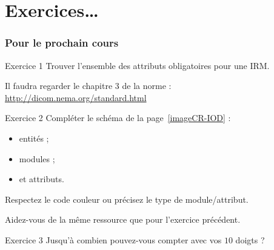 \section{Exercices\ldots}

	\frame
	{
		\frametitle{Pour le prochain cours}
		
		{
			\begin{block}{Exercice 1}
				Trouver l'ensemble des attributs obligatoires pour une IRM.

				Il faudra regarder le chapitre 3 de la norme : \url{http://dicom.nema.org/standard.html}
			\end{block}
		}

		{
			\begin{block}{Exercice 2}
				Compl\'eter le sch\'ema de la page~\ref{imageCR-IOD} :
				\begin{itemize}
					\item entit\'es ;
					\item modules ;
					\item et attributs.
				\end{itemize}
				Respectez le code couleur ou pr\'ecisez le type de module/attribut.

				Aidez-vous de la m\^eme ressource que pour l'exercice pr\'ec\'edent.
			\end{block}
		}

		{
			\begin{block}{Exercice 3}
				Jusqu'\`a combien pouvez-vous compter avec vos $10$ doigts ?
			\end{block}
		}
	}
